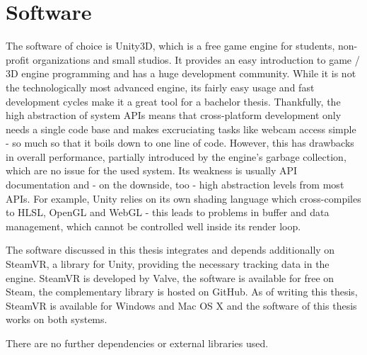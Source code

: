 \section{Software}

The software of choice is Unity3D, which is a free game engine for students, 
non-profit organizations and small studios. It provides an easy introduction to 
game / 3D engine programming and has a huge development community. While it is 
not the technologically most advanced engine, its fairly easy usage and fast 
development cycles make it a great tool for a bachelor thesis.
\newline
Thankfully, the high abstraction of system APIs means that cross-platform 
development only needs a single code base and makes excruciating tasks like 
webcam access simple - so much so that it boils down to one line of code. 
However, this has drawbacks in overall performance, partially introduced by the 
engine's garbage collection, which are no issue for the used system.
\newline
Its weakness is usually API documentation and - on the downside, too - high 
abstraction levels from most APIs. For example, Unity relies on its own shading 
language which cross-compiles to HLSL, OpenGL and WebGL - this leads to 
problems in buffer and data management, which cannot be controlled well inside 
its render loop.

The software discussed in this thesis integrates and depends additionally on 
SteamVR, a library for Unity, providing the necessary tracking data in the 
engine. SteamVR is developed by Valve, the software is available for free on 
Steam, the complementary library is hosted on GitHub. As of writing this 
thesis, SteamVR is available for Windows and Mac OS X and the software of this 
thesis works on both systems. 

There are no further dependencies or external libraries used.